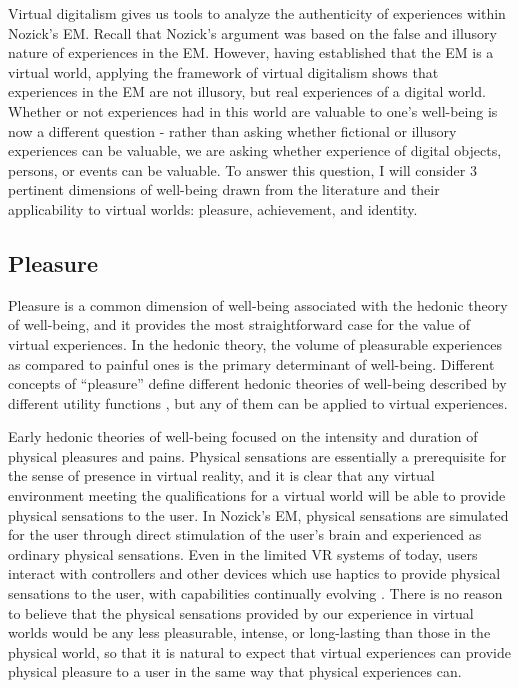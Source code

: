 Virtual digitalism gives us tools to analyze the authenticity of experiences
within Nozick's EM. Recall that Nozick's argument was based on the false and 
illusory nature of experiences in the EM. However, having established that the
EM is a virtual world, applying the framework of virtual digitalism shows that 
experiences in the EM are not illusory, but real experiences of a digital world.
Whether or not experiences had in this world are valuable to one's well-being is
now a different question - rather than asking whether fictional or illusory 
experiences can be valuable, we are asking whether experience of digital
objects, persons, or events can be valuable. To answer this question, I will
consider 3 pertinent dimensions of well-being drawn from the literature and
their applicability to virtual worlds: pleasure, achievement, and identity.

\subsection{Pleasure}
Pleasure is a common dimension of well-being associated with the hedonic theory
of well-being, and it provides the most straightforward case for the value of
virtual experiences. In the hedonic theory, the volume of pleasurable
experiences as compared to painful ones is the primary determinant of
well-being. Different concepts of ``pleasure'' define different hedonic theories
of well-being described by different utility functions
\citep{kahneman1999objective}, but any of them can be applied to virtual
experiences.

Early hedonic theories of well-being focused on the intensity and duration of 
physical pleasures and pains. Physical sensations are essentially a prerequisite
for the sense of presence in virtual reality, and it is clear that any virtual
environment meeting the qualifications for a virtual world will be able to 
provide physical sensations to the user. In Nozick's EM, physical sensations
are simulated for the user through direct stimulation of the user's brain and
experienced as ordinary physical sensations. Even in the limited VR systems of
today, users interact with controllers and other devices which use haptics to
provide physical sensations to the user, with capabilities continually evolving
\citep{WANG2019136}. There is no reason to believe that the physical sensations
provided by our experience in virtual worlds would be any less pleasurable,
intense, or long-lasting than those in the physical world, so that it is natural
to expect that virtual experiences can provide physical pleasure to a user in
the same way that physical experiences can.

